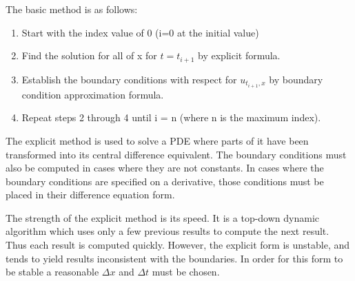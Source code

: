 
The basic method is as follows:
\begin{enumerate}
\item Start with the index value of 0 (i=0 at the initial value)
\item Find the solution for all of x for $t=t_{i+1} $ by explicit formula.
\item Establish the boundary conditions with respect for $u_{t_{i+1} ,x}$ by boundary condition approximation formula.
\item Repeat steps 2 through 4 until i = n (where n is the maximum index).
\end{enumerate}


The explicit method is used to solve a PDE where parts of it have been transformed into its central difference equivalent.  The boundary conditions must also be computed in cases where they are not constants.  In cases where the boundary conditions are specified on a derivative, those conditions must be placed in their difference equation form.  %

The strength of the explicit method is its speed.  It is a top-down dynamic algorithm which uses only a few previous results to compute the next result.  Thus each result is computed quickly.  However, the
explicit form is unstable, and tends to yield results inconsistent with the boundaries.   In order for this form to be stable a reasonable $\Delta x$ and $\Delta t$ must be chosen.  




